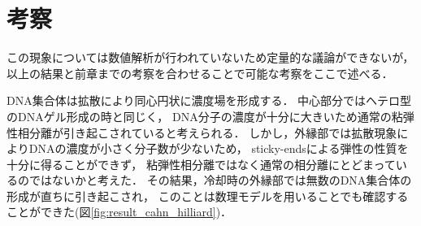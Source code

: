 \section{考察}
この現象については数値解析が行われていないため定量的な議論ができないが，
以上の結果と前章までの考察を合わせることで可能な考察をここで述べる．

DNA集合体は拡散により同心円状に濃度場を形成する．
中心部分ではヘテロ型のDNAゲル形成の時と同じく，
DNA分子の濃度が十分に大きいため通常の粘弾性相分離が引き起こされていると考えられる．
しかし，外縁部では拡散現象によりDNAの濃度が小さく分子数が少ないため，
sticky-endsによる弾性の性質を十分に得ることができず，
粘弾性相分離ではなく通常の相分離にとどまっているのではないかと考えた．
その結果，冷却時の外縁部では無数のDNA集合体の形成が直ちに引き起こされ，
このことは数理モデルを用いることでも確認することができた(図\ref{fig:result_cahn_hilliard})．

